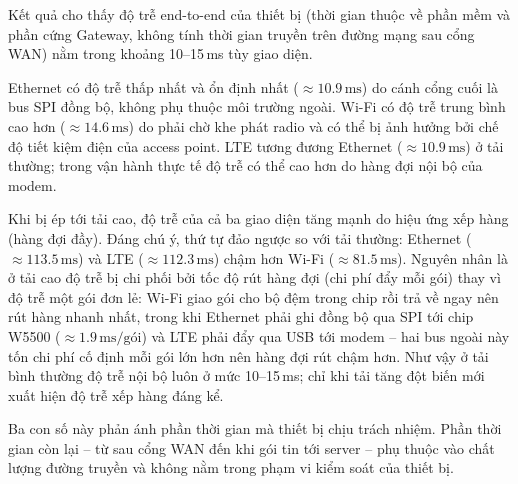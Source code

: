 Kết quả cho thấy độ trễ end-to-end của thiết bị (thời gian thuộc về phần mềm và phần cứng Gateway, không tính thời gian truyền trên đường mạng sau cổng WAN) nằm trong khoảng 10--15\,ms tùy giao diện.

Ethernet có độ trễ thấp nhất và ổn định nhất ($\approx 10{.}9\,\text{ms}$) do cánh cổng cuối là bus SPI đồng bộ, không phụ thuộc môi trường ngoài. Wi-Fi có độ trễ trung bình cao hơn ($\approx 14{.}6\,\text{ms}$) do phải chờ khe phát radio và có thể bị ảnh hưởng bởi chế độ tiết kiệm điện của access point. LTE tương đương Ethernet ($\approx 10{.}9\,\text{ms}$) ở tải thường; trong vận hành thực tế độ trễ có thể cao hơn do hàng đợi nội bộ của modem.

Khi bị ép tới tải cao, độ trễ của cả ba giao diện tăng mạnh do hiệu ứng xếp hàng (hàng đợi đầy). Đáng chú ý, thứ tự đảo ngược so với tải thường: Ethernet ($\approx 113{.}5\,\text{ms}$) và LTE ($\approx 112{.}3\,\text{ms}$) chậm hơn Wi-Fi ($\approx 81{.}5\,\text{ms}$). Nguyên nhân là ở tải cao độ trễ bị chi phối bởi tốc độ rút hàng đợi (chi phí đẩy mỗi gói) thay vì độ trễ một gói đơn lẻ: Wi-Fi giao gói cho bộ đệm trong chip rồi trả về ngay nên rút hàng nhanh nhất, trong khi Ethernet phải ghi đồng bộ qua SPI tới chip W5500 ($\approx 1{.}9\,\text{ms/gói}$) và LTE phải đẩy qua USB tới modem -- hai bus ngoài này tốn chi phí cố định mỗi gói lớn hơn nên hàng đợi rút chậm hơn. Như vậy ở tải bình thường độ trễ nội bộ luôn ở mức 10--15\,ms; chỉ khi tải tăng đột biến mới xuất hiện độ trễ xếp hàng đáng kể.

Ba con số này phản ánh phần thời gian mà thiết bị chịu trách nhiệm. Phần thời gian còn lại -- từ sau cổng WAN đến khi gói tin tới server -- phụ thuộc vào chất lượng đường truyền và không nằm trong phạm vi kiểm soát của thiết bị.